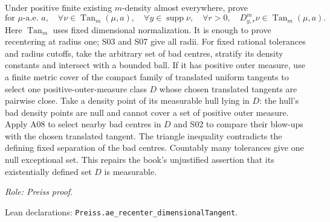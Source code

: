 \begin{lemma}
\label{lem:recenter}






Under positive finite existing $m$-density almost everywhere, prove
\[
 \text{for }\mu\text{-a.e. }a,\quad
 \forall\nu\in\operatorname{Tan}_m(\mu,a),\quad
 \forall y\in\operatorname{supp}\nu,\quad\forall r>0,
 \quad D^m_{y,r}\nu\in\operatorname{Tan}_m(\mu,a).
\]
Here $\operatorname{Tan}_m$ uses fixed dimensional normalization.
It is enough to prove recentering at radius one; S03 and S07 give all radii.
For fixed rational tolerances and radius cutoffs, take the arbitrary set of
bad centres, stratify its density constants and intersect with a bounded ball.
If it has positive outer measure, use a finite metric cover of the compact
family of translated uniform tangents to select one positive-outer-measure
class $D$ whose chosen translated tangents are pairwise close.
Take a density point of its measurable hull lying in $D$: the hull's bad
density points are null and cannot cover a set of positive outer measure.
Apply A08 to select nearby bad centres in $D$ and S02 to compare their blow-ups
with the chosen translated tangent. The triangle inequality contradicts the
defining fixed separation of the bad centres. Countably many tolerances give
one null exceptional set. This repairs the book's unjustified assertion that
its existentially defined set $D$ is measurable.
\par\emph{Role: Preiss proof.}
\par Lean declarations: \texttt{Preiss.ae\_recenter\_dimensionalTangent}.
\end{lemma}
